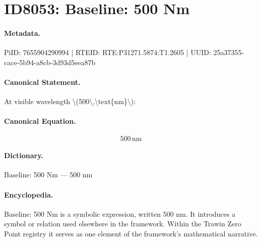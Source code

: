 \section*{ID8053: Baseline: 500 Nm}
\paragraph{Metadata.}
PiID: 7655904290994 | RTEID: RTE:P31271.5874:T1.2605 | UUID: 25a37355-cace-5b94-a8cb-3d93d5eea87b

\paragraph{Canonical Statement.}
At visible wavelength \textbackslash{}(500\textbackslash{},\textbackslash{}text\{nm\}\textbackslash{}):

\paragraph{Canonical Equation.}
\[
500\,\text{nm}
\]

\paragraph{Dictionary.}
Baseline: 500 Nm — 500 nm

\paragraph{Encyclopedia.}
Baseline: 500 Nm is a symbolic expression, written 500 nm. It introduces a symbol or relation used elsewhere in the framework. Within the Trawin Zero Point registry it serves as one element of the framework's mathematical narrative.

